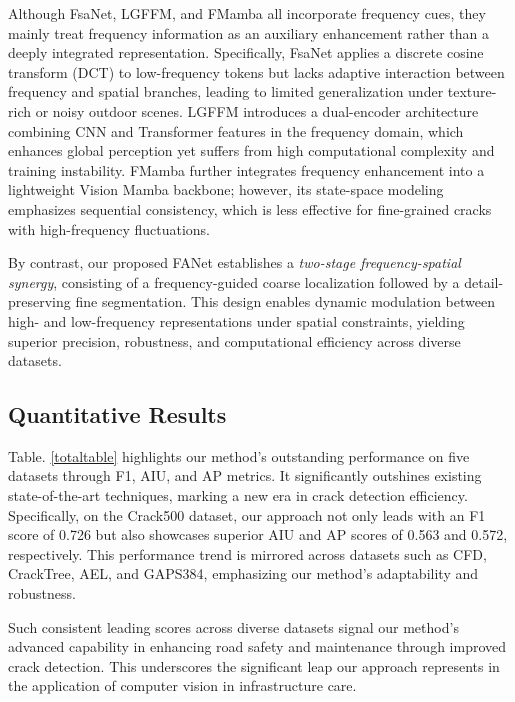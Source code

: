 \documentclass[journal]{IEEEtran}
\begin{document}
Although FsaNet, LGFFM, and FMamba all incorporate frequency cues, they mainly treat frequency information as an auxiliary enhancement rather than a deeply integrated representation. 
Specifically, FsaNet applies a discrete cosine transform (DCT) to low-frequency tokens but lacks adaptive interaction between frequency and spatial branches, leading to limited generalization under texture-rich or noisy outdoor scenes. 
LGFFM introduces a dual-encoder architecture combining CNN and Transformer features in the frequency domain, which enhances global perception yet suffers from high computational complexity and training instability. 
FMamba further integrates frequency enhancement into a lightweight Vision Mamba backbone; however, its state-space modeling emphasizes sequential consistency, which is less effective for fine-grained cracks with high-frequency fluctuations.



By contrast, our proposed FANet establishes a \emph{two-stage frequency-spatial synergy}, consisting of a frequency-guided coarse localization followed by a detail-preserving fine segmentation. 
This design enables dynamic modulation between high- and low-frequency representations under spatial constraints, yielding superior precision, robustness, and computational efficiency across diverse datasets.



%
%



\subsection{Quantitative Results}

Table. \ref{totaltable} highlights our method's outstanding performance on five datasets through F1, AIU, and AP metrics. It significantly outshines existing state-of-the-art techniques, marking a new era in crack detection efficiency. Specifically, on the Crack500 dataset, our approach not only leads with an F1 score of 0.726 but also showcases superior AIU and AP scores of 0.563 and 0.572, respectively. This performance trend is mirrored across datasets such as CFD, CrackTree, AEL, and GAPS384, emphasizing our method's adaptability and robustness.

Such consistent leading scores across diverse datasets signal our method's advanced capability in enhancing road safety and maintenance through improved crack detection. This underscores the significant leap our approach represents in the application of computer vision in infrastructure care.
\end{document}
